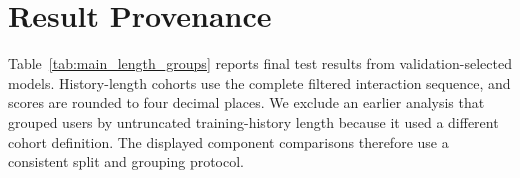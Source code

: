 \documentclass[11pt]{article}
\begin{document}

\section{Result Provenance}
\label{app:runs}
Table~\ref{tab:main_length_groups} reports final test results from validation-selected models. History-length cohorts use the complete filtered interaction sequence, and scores are rounded to four decimal places. We exclude an earlier analysis that grouped users by untruncated training-history length because it used a different cohort definition. The displayed component comparisons therefore use a consistent split and grouping protocol.
\end{document}
